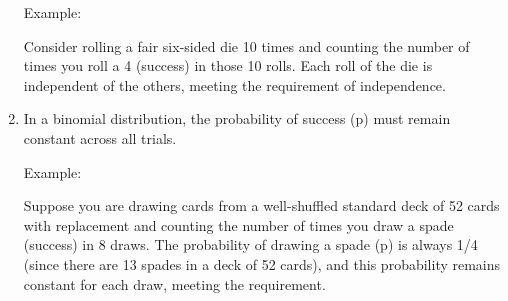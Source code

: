 \documentclass{article}[]
\begin{document}
\begin{enumerate}
{Example:

Consider rolling a fair six-sided die 10 times and counting the number of times you roll a 4 (success) in those 10 rolls. Each roll of the die is independent of the others, meeting the requirement of independence.
}
\item
{
In a binomial distribution, the probability of success (p) must remain constant across all trials.

Example: 

Suppose you are drawing cards from a well-shuffled standard deck of 52 cards with replacement and counting the number of times you draw a spade (success) in 8 draws. The probability of drawing a spade (p) is always 1/4 (since there are 13 spades in a deck of 52 cards), and this probability remains constant for each draw, meeting the requirement.
}
\end{enumerate}
\end{document}
